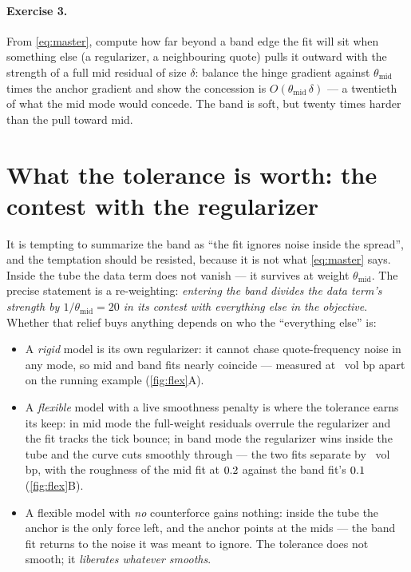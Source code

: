 \documentclass[11pt]{article}
\begin{document}
\paragraph{Exercise 3.}
From \eqref{eq:master}, compute how far beyond a band edge the fit will
sit when something else (a regularizer, a neighbouring quote) pulls it
outward with the strength of a full mid residual of size $\delta$: balance
the hinge gradient against $\theta_{\mathrm{mid}}$ times the anchor
gradient and show the concession is
$O(\theta_{\mathrm{mid}}\,\delta)$ --- a twentieth of what the mid mode
would concede.  The band is soft, but twenty times harder than the pull
toward mid.

\section{What the tolerance is worth: the contest with the regularizer}
\label{sec:contest}

It is tempting to summarize the band as ``the fit ignores noise inside
the spread'', and the temptation should be resisted, because it is not
what \eqref{eq:master} says.  Inside the tube the data term does not
vanish --- it survives at weight $\theta_{\mathrm{mid}}$.  The precise
statement is a re-weighting: \emph{entering the band divides the data
term's strength by $1/\theta_{\mathrm{mid}}=20$ in its contest with
everything else in the objective}.  Whether that relief buys anything
depends on who the ``everything else'' is:

\begin{itemize}[leftmargin=1.6em,itemsep=1pt]
\item A \emph{rigid} model is its own regularizer: it cannot chase
quote-frequency noise in any mode, so mid and band fits nearly coincide
--- measured at \objmflexrigid\ vol bp apart on the running example
(\cref{fig:flex}A).
\item A \emph{flexible} model with a live smoothness penalty is where the
tolerance earns its keep: in mid mode the full-weight residuals overrule
the regularizer and the fit tracks the tick bounce; in band mode the
regularizer wins inside the tube and the curve cuts smoothly through ---
the two fits separate by \objmflexflex\ vol bp, with the roughness of
the mid fit at $0.2$ against the band fit's $0.1$
(\cref{fig:flex}B).
\item A flexible model with \emph{no} counterforce gains nothing: inside
the tube the anchor is the only force left, and the anchor points at the
mids --- the band fit returns to the noise it was meant to ignore.  The
tolerance does not smooth; it \emph{liberates whatever smooths}.
\end{itemize}
\end{document}
